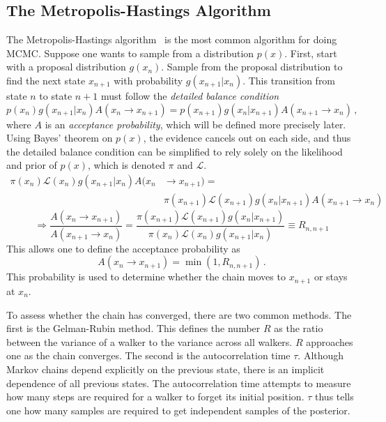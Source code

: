 \subsection{The Metropolis-Hastings Algorithm}
The Metropolis-Hastings algorithm~\cite{tobias_metropolis-hastings_nodate,zhao_bayesian_2021,helsby_monte_nodate} is the most common algorithm for doing MCMC. Suppose one wants to sample from a distribution $p(x)$. First, start with a proposal distribution $g(x_n)$. 
Sample from the proposal distribution to find the next state $x_{n+1}$ with probability $g(x_{n+1}|x_n)$. 
This transition from state $n$ to state $n+1$ must follow the \textit{detailed balance condition}
\begin{equation}
	p(x_n) g(x_{n+1}|x_n) A(x_n \rightarrow x_{n+1}) = p(x_{n+1}) g(x_n|x_{n+1}) A(x_{n+1} \rightarrow x_{n})\,,
\end{equation}
where $A$ is an \textit{acceptance probability}, which will be defined more precisely later. 
Using Bayes' theorem on $p(x)$, the evidence cancels out on each side, 
and thus the detailed balance condition can be simplified to rely solely on the likelihood and prior of $p(x)$, 
which is denoted $\pi$ and $\mathcal{L}$.
\begin{equation}
	\begin{split}
		\pi(x_n)\mathcal{L}(x_n) g(x_{n+1}|x_n) A(x_n &\rightarrow x_{n+1}) = \\
		&\pi(x_{n+1}) \mathcal{L}(x_{n+1}) g(x_{n}|x_{n+1}) A(x_{n+1}\rightarrow x_{n})
	\end{split}
\end{equation}
\begin{equation}
	\Rightarrow \frac{A(x_n \rightarrow x_{n+1})}{A(x_{n+1}\rightarrow x_{n})} = \frac{\pi(x_{n+1}) \mathcal{L}(x_{n+1}) g(x_{n}|x_{n+1})}{\pi(x_n)\mathcal{L}(x_n) g(x_{n+1}|x_n)} \equiv R_{n,n+1}
\end{equation}
This allows one to define the acceptance probability as
\begin{equation}
	A(x_n \rightarrow x_{n+1}) = \min( 1, R_{n,n+1} )\,.
\end{equation}
This probability is used to determine whether the chain moves to $x_{n+1}$ or stays at $x_n$.

To assess whether the chain has converged, there are two common methods. The first is the Gelman-Rubin method. This defines the number $R$ as the ratio between the variance of a walker to the variance across all walkers. $R$ approaches one as the chain converges. The second is the autocorrelation time $\tau$. Although Markov chains depend explicitly on the previous state, there is an implicit dependence of all previous states. The autocorrelation time attempts to measure how many steps are required for a walker to forget its initial position. $\tau$ thus tells one how many samples are required to get independent samples of the posterior.

